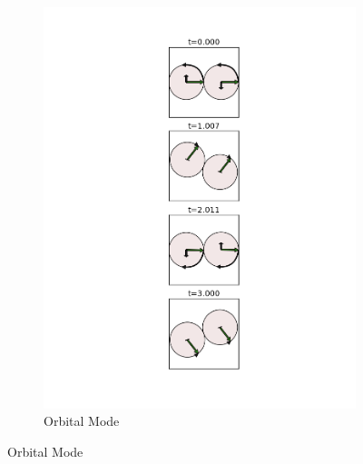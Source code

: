 \documentclass[prb,preprint]{revtex4-1}
\begin{document}
\begin{figure}[h]
	\begin{subfigure}{.3\textwidth}
	  \centering
	  \includegraphics[height=0.6\textheight]{./images/orbital_animatic.png}
	  \caption{Orbital Mode}
	  \label{fig:ofig1}
	\end{subfigure}%
	

\end{figure}
\end{document}
